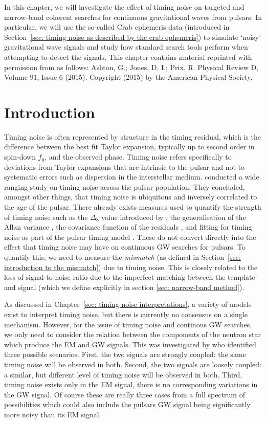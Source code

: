\documentclass[../full_thesis/full_thesis.tex]{subfiles}
\begin{document}
In this chapter, we will investigate the effect of timing noise on targeted and
narrow-band coherent searches for continuous gravitational waves from pulsars.
In particular, we will use the so-called Crab ephemeris data (introduced in
Section~\ref{sec: timing noise as described by the crab ephemeris}) to simulate
`noisy' gravitational wave signals and study how standard search tools perform
when attempting to detect the signals. This chapter contains material reprinted
with permission from \citet{Ashton2015} as follows: Ashton, G.; Jones, D. I.;
Prix, R. Physical Review D, Volume 91, Issue 6 (2015).  Copyright (2015) by the
American Physical Society.

\section{Introduction}
\label{sec: narrow-band introduction}

Timing noise is often represented by structure in the timing residual, which is
the difference between the best fit Taylor expansion, typically up to second
order in spin-down $\ddot{f}_0$, and the observed phase. Timing noise refers
specifically to deviations from Taylor expansions that are intrinsic to the
pulsar and not to systematic errors such as dispersion in the interstellar
medium.  \citet{Hobbs2010} conducted a wide ranging study on timing noise
across the pulsar population.  They concluded, amongst other things, that
timing noise is ubiquitous and inversely correlated to the age of the pulsar.
There already exists measures used to quantify the strength of timing noise
such as the $\Delta_{8}$ value introduced by \citet{Arzoumanian1994}, the
generalisation of the Allan variance \citep{Matsakis1997}, the covariance
function of the residuals \citep{Coles2011}, and fitting for timing noise as
part of the pulsar timing model \citep{Lentati2014}. These do not convert
directly into the effect that timing noise may have on continuous GW searches
for pulsars. To quantify this, we need to measure the \emph{mismatch} (as
defined in Section~\ref{sec: introduction to the mismatch}) due to
timing noise. 
This is closely related to the loss of signal to noise ratio due
to the imperfect matching between the template and signal (which we define
explicitly in section \ref{sec: narrow-band method}).

As discussed in Chapter~\ref{sec: timing noise interpretations},
a variety of models exist to interpret timing noise, but there is
currently no consensus on a single mechanism. However, for the issue of timing
noise and continous GW searches, we only need to consider the relation between the
components of the neutron star which produce the EM and GW signals.  This was
investigated by \citet{Jones2004} who identified three possible scenarios.
First, the two signals are strongly coupled: the same timing noise will be
observed in both. Second, the two signals are loosely coupled: a similar, but
different level of timing noise will be observed in both. Third, timing noise
exists only in the EM signal, there is no corresponding variations in the GW
signal. Of course these are really three cases from a full spectrum of
possibilities which could also include the pulsars GW signal being significantly more noisy than its EM signal.
\end{document}
